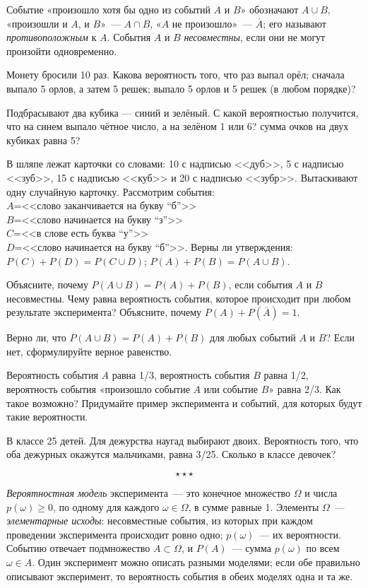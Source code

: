 Событие «произошло хотя бы одно из событий $A$ и $B$» обозначают $A\cup B$, «произошли и $A$, и $B$»~— $A\cap B$, «$A$ не произошло»~— $\overline{A}$; его называют \textit{противоположным} к $A$. События $A$ и $B$ \textit{несовместны}, если они не могут произойти одновременно.




\z Монету бросили 10 раз. Какова вероятность того, что 
 раз выпал орёл;
 сначала выпало 5 орлов, а затем 5 решек;
 выпало 5 орлов и 5 решек (в любом порядке)?


\z Подбрасывают два кубика --- синий и зелёный. С какой вероятностью получится, что
 на синем выпало чётное число, а на зелёном 1 или 6?
 сумма очков на двух кубиках равна 5?


\z В шляпе лежат карточки со словами: 10 с надписью  <<дуб>>, 5 с надписью <<зуб>>,  15 с надписью <<куб>> и 20 с надписью <<зубр>>. Вытаскивают одну случайную карточку. Рассмотрим события:\\ $A$=<<слово заканчивается на букву ``б''>>\\ $B$=<<слово начинается на букву ``з''>>\\$C$=<<в слове есть буква ``у''>>\\ $D$=<<слово начинается на букву ``б''>>. Верны ли утверждения:
 $P(C)+P(D)=P(C\cup D)$;
 $P(A)+P(B)=P(A\cup B)$.

\newpage

\zncirc  Объясните, почему $P(A\cup B)=P(A)+P(B)$, если события $A$ и $B$ несовместны.  Чему равна вероятность события, которое происходит при любом результате эксперимента?  Объясните, почему $P(A)+P(\overline{A})=1$.

\zpcirc Верно ли, что $P(A\cup B)=P(A)+P(B)$ для любых событий $A$ и $B$? Если нет, сформулируйте верное равенство.


\zp Вероятность события $A$ равна 1/3, вероятность события $B$ равна 1/2, вероятность события «произошло событие $A$ или событие $B$» равна 2/3. Как такое возможно? Придумайте пример эксперимента и событий, для которых будут такие вероятности.


\zp В классе 25 детей. Для дежурства наугад выбирают двоих. Вероятность того, что оба дежурных окажутся мальчиками, равна 3/25. Сколько в классе девочек?


\vspace{-.2cm}

$$\star\star\star$$

\textit{Вероятностная модель} эксперимента~— это конечное множество $\Omega$ и числа $p(\omega)\ge 0$, по одному для каждого $\omega\in\Omega$, в сумме равные 1. Элементы $\Omega$~— \textit{элементарные исходы}: несовместные события, из которых при каждом проведении эксперимента происходит ровно одно; $p(\omega)$~— их вероятности. Событию отвечает подмножество $A\subset\Omega$, и $P(A)$~— сумма $p(\omega)$ по всем $\omega\in A$. Один эксперимент можно описать разными моделями; если обе правильно описывают эксперимент, то вероятность события в обеих моделях одна и та же.

